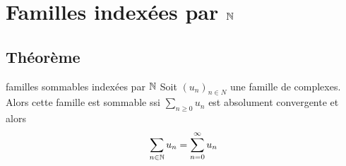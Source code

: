 \section{Familles indexées par \texorpdfstring{$\mathbb{N}$}{N}}
\subsection{Théorème}

\begin{theoreme}{familles sommables indexées par $\mathbb{N}$}{}
    Soit $(u_n)_{n \in N}$ une famille de complexes. Alors
    cette famille est sommable ssi $\displaystyle \sum_{n \geqslant 0} u_n$ est 
    absolument convergente et alors 
    $$\sum_{n \in \mathbb{N}} u_n = \sum_{n = 0}^\infty u_n$$    
\end{theoreme}

